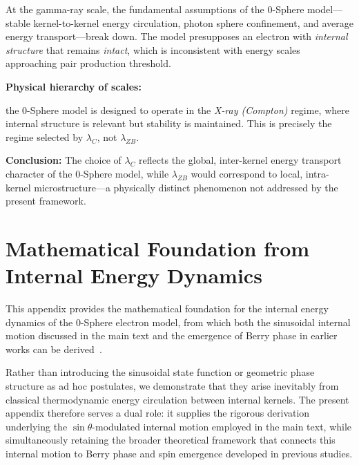 \documentclass[%
 reprint,
 amsmath,amssymb,
 aps,
 prb,
]{revtex4-2}
\numberwithin{equation}{section}
\begin{document}
At the gamma-ray scale, the fundamental assumptions of the 0-Sphere model—stable kernel-to-kernel energy circulation, photon sphere confinement, and average energy transport—break down. The model presupposes an electron with \textit{internal structure} that remains \textit{intact}, which is inconsistent with energy scales approaching pair production threshold.

\vspace{0.5cm}

\noindent\textbf{Physical hierarchy of scales:}

\vspace{0.3cm}

the 0-Sphere model is designed to operate in the \textit{X-ray (Compton)} regime, where internal structure is relevant but stability is maintained. This is precisely the regime selected by $\lambda_C$, not $\lambda_{ZB}$.

\vspace{1.0cm}

\noindent\textbf{Conclusion:} The choice of $\lambda_C$ reflects the global, inter-kernel energy transport character of the 0-Sphere model, while $\lambda_{ZB}$ would correspond to local, intra-kernel microstructure—a physically distinct phenomenon not addressed by the present framework.

\clearpage

\section{Mathematical Foundation from Internal Energy Dynamics}
\label{sec:internal_energy_dynamics}

This appendix provides the mathematical foundation for the internal energy dynamics of the 0-Sphere electron model, from which both the sinusoidal internal motion discussed in the main text and the emergence of Berry phase in earlier works can be derived~\cite{hanamura17765409}.

Rather than introducing the sinusoidal state function or geometric phase structure as ad hoc postulates, we demonstrate that they arise inevitably from classical thermodynamic energy circulation between internal kernels. The present appendix therefore serves a dual role: it supplies the rigorous derivation underlying the $\sin\theta$-modulated internal motion employed in the main text, while simultaneously retaining the broader theoretical framework that connects this internal motion to Berry phase and spin emergence developed in previous studies.
\end{document}
